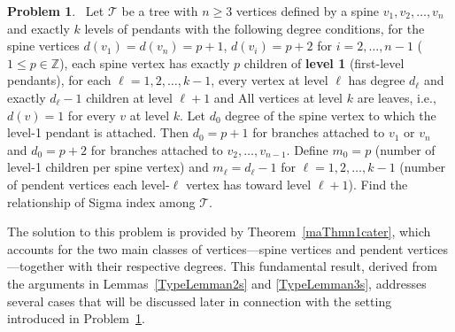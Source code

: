 \documentclass[12pt, a4paper]{article}
\theoremstyle{plain}  %
\theoremstyle{definition}  %
\newtheorem{problem}{Problem}
\newcommand{\TT}{\mathcal{T}}
\begin{document}
\begin{problem}~\label{problemThnumber2}
Let $\TT$ be a tree with $n \geq 3$ vertices defined by a spine $v_1, v_2, \dots, v_n$ and exactly $k$ levels of pendants with the following degree conditions, for the spine vertices $d(v_1)=d(v_n)=p+1$, $d(v_i)=p+2$ for $i=2,\dots,n-1$ ($1 \leq p \in \mathbb{Z}$), each spine vertex has exactly $p$ children of \textbf{level 1} (first-level pendants), for each $\ell = 1, 2, \dots, k-1$, every vertex at level $\ell$ has degree $d_\ell$ and exactly $d_\ell - 1$ children at level $\ell+1$ and All vertices at level $k$ are leaves, i.e., $d(v) = 1$ for every $v$ at level $k$.   Let $d_0$ degree of the spine vertex to which the level-1 pendant is attached. Then $d_0 = p+1$ for branches attached to $v_1$ or $v_n$ and $d_0 = p+2$ for branches attached to $v_2, \dots, v_{n-1}$.
Define $m_0=p$ (number of level-1 children per spine vertex) and $m_\ell = d_\ell - 1$ for $\ell = 1, 2, \dots, k-1$
(number of pendent vertices each level-$\ell$ vertex has toward level $\ell+1$).  Find the relationship of Sigma index among $\TT$.
\end{problem}

The solution to this problem is provided by Theorem~\ref{maThmn1cater}, which accounts for the two main classes of vertices---spine vertices and pendent vertices---together with their respective degrees. This fundamental result, derived from the arguments in Lemmas~\ref{TypeLemman2s} and \ref{TypeLemman3s}, addresses several cases that will be discussed later in connection with the setting introduced in Problem~\ref{problemThnumber2}.
\end{document}
